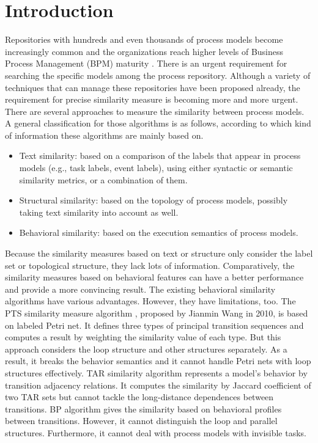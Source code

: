\documentclass{llncs}
\begin{document}
\section{Introduction}
Repositories with hundreds and even thousands of process models become increasingly common \cite{rosemann2006potential} and the organizations reach higher levels of Business Process Management (BPM) maturity \cite{van2003business}. There is an urgent requirement for searching the specific models among the process repository. Although a variety of techniques that can manage these repositories have been proposed already, the requirement for precise similarity measure is becoming more and more urgent. There are several approaches to measure the similarity between process models. A general classification for those algorithms \cite{wang2013querying} is as follows, according to which kind of information these algorithms are mainly based on. 
\begin{itemize}
\item Text similarity: based on a comparison of the labels that appear in process models (e.g., task labels, event labels), using either syntactic or semantic similarity metrics, or a combination of them.
\item Structural similarity: based on the topology of process models, possibly taking text similarity into account as well.
\item Behavioral similarity: based on the execution semantics of process models.
\end{itemize}

Because the similarity measures based on text or structure only consider the label set or topological structure, they lack lots of information. Comparatively, the similarity measures based on behavioral features can have a better performance and provide a more convincing result.  The existing behavioral similarity algorithms have various advantages. However, they have limitations, too. The PTS similarity measure algorithm \cite{wang2010behavioral}, proposed by Jianmin Wang in 2010, is based on labeled Petri net. It defines three types of principal transition sequences and computes a result by weighting the similarity value of each type. But this approach considers the loop structure and other structures separately. As a result, it breaks the behavior semantics and it cannot handle Petri nets with loop structures effectively. 
TAR similarity algorithm \cite{zha2010workflow} represents a model's behavior by transition adjacency relations. It computes the similarity by Jaccard coefficient of two TAR sets but cannot tackle the long-distance dependences between transitions. 
BP algorithm \cite{weidlich2011efficient} gives the similarity based on behavioral profiles between transitions. However, it cannot distinguish the loop and parallel structures. Furthermore, it cannot deal with process models with invisible tasks.
\end{document}
